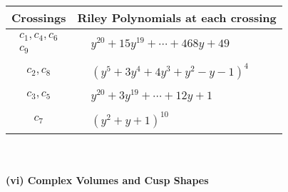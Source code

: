 \documentclass[1p]{elsarticle_modified}
\theoremstyle{definition}
\begin{document}
\begin{tabular}{m{50pt}|m{274pt}}
Crossings & \hspace{64pt}Riley Polynomials at each crossing \\
\hline $$\begin{aligned}c_{1},c_{4},c_{6}\\c_{9}\end{aligned}$$&$\begin{aligned}
&y^{20}+15 y^{19}+\cdots+468 y+49
\end{aligned}$\\
\hline $$\begin{aligned}c_{2},c_{8}\end{aligned}$$&$\begin{aligned}
&(y^5+3 y^4+4 y^3+y^2- y-1)^4
\end{aligned}$\\
\hline $$\begin{aligned}c_{3},c_{5}\end{aligned}$$&$\begin{aligned}
&y^{20}+3 y^{19}+\cdots+12 y+1
\end{aligned}$\\
\hline $$\begin{aligned}c_{7}\end{aligned}$$&$\begin{aligned}
&(y^2+y+1)^{10}
\end{aligned}$\\
\hline
\end{tabular}\\~\\
\newpage\flushleft \textbf{(vi) Complex Volumes and Cusp Shapes}
\end{document}
